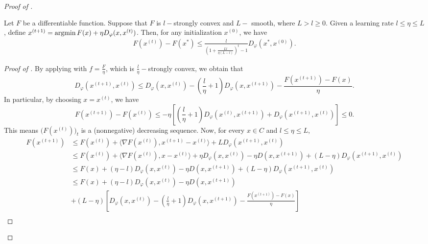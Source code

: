 \begin{proof}[Proof of ]
\begin{lemma}
\label{lemma:bppa_conv}
    Let $F$ be a differentiable function. Suppose that $F$ is $l-$strongly convex and $L-$ smooth,
    where $L > l \geq 0$. Given a learning rate $l \leq \eta \leq L$,
    define $x^{(t+1)} = \operatorname*{argmin} F(x) + \eta D_{\varphi}(x, x^{(t)})$.
    Then, for any initialization $x^{(0)}$, we have
    \begin{align}
        F(x^{(t)}) - F(x^*) \leq \frac{l}{\left( 1 + \frac{Ll }{\eta (L - l)} \right)^t - 1}
        D_{\varphi}(x^*, x^{(0)}).
\end{align}
\end{lemma}
\begin{proof}[Proof of ]
By applying  with $f = \frac{F}{\eta}$,
which is $\frac{l}{\eta}-$strongly convex, we obtain that
\begin{equation}
    D_{\varphi}(x^{(t+1)}, x^{(t)}) \leq D_{\varphi}(x, x^{(t)})
    - \left( \frac{l}{\eta} + 1 \right) D_{\varphi}(x, x^{(t+1)})
    - \frac{F(x^{(t+1)}) - F(x)}{\eta}.
\end{equation}
In particular, by choosing $x = x^{(t)}$, we have
\begin{equation}
    F(x^{(t+1)}) - F(x^{(t)}) \leq - \eta \left[ \left(\frac{l}{\eta} + 1 \right)
    D_{\varphi}(x^{(t)}, x^{(t+1)}) + D_{\varphi}(x^{(t+1)}, x^{(t)}) \right] \leq 0.
\end{equation}
This means $\big(F(x^{(t)}) \big)_t$ is a (nonnegative) decreasing sequence.
Now, for every $x \in C$ and $l \leq \eta \leq L$,
\begin{align}
    F(x^{(t+1)})
    &\leq F(x^{(t)}) + \langle \nabla F(x^{(t)}), x^{(t+1)} - x^{(t)} \rangle
    + L D_{\varphi}(x^{(t+1)}, x^{(t)}) \\
    &\leq F(x^{(t)}) + \langle \nabla F(x^{(t)}), x - x^{(t)} \rangle
    + \eta D_{\varphi}(x, x^{(t)}) - \eta D(x, x^{(t+1)})
    + (L - \eta) D_{\varphi}(x^{(t+1)}, x^{(t)}) \\
    &\leq F(x) + (\eta - l) D_{\varphi}(x, x^{(t)})
    - \eta D(x, x^{(t+1)}) + (L - \eta) D_{\varphi}(x^{(t+1)}, x^{(t)}) \\
    &\leq F(x) + (\eta - l) D_{\varphi}(x, x^{(t)}) - \eta D(x, x^{(t+1)}) \\
    &+ (L - \eta) \left[ D_{\varphi}(x, x^{(t)})
    - \left( \frac{l}{\eta} + 1 \right) D_{\varphi}(x, x^{(t+1)})
    - \frac{F(x^{(t+1)}) - F(x)}{\eta} \right] \\

\end{align}
\end{proof}
\end{proof}
